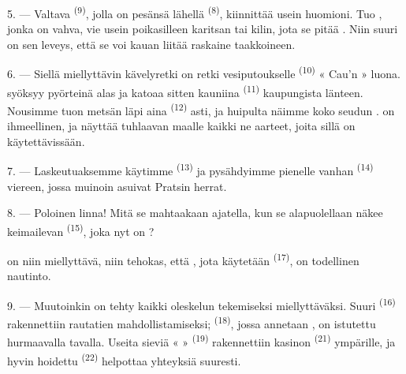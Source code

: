 5. --- Valtava  \textsuperscript{(9)}, jolla on pesänsä lähellä
 \textsuperscript{(8)}, kiinnittää usein huomioni. Tuo
, jonka  on vahva, vie usein poikasilleen
karitsan tai kilin, jota se pitää . Niin suuri on sen
 leveys, että se voi kauan liitää raskaine taakkoineen.

\VUsaut{3.0mm}
\VUsaut{3.0mm}

6. --- Siellä miellyttävin kävelyretki on retki vesiputoukselle
\textsuperscript{(10)} « Cau'n » luona.  syöksyy pyörteinä
alas ja katoaa sitten kauniina  
\textsuperscript{(11)} kaupungista länteen. Nousimme tuon metsän läpi aina
 \textsuperscript{(12)} asti, ja
 huipulta näimme koko seudun .
 on ihmeellinen, ja  näyttää tuhlaavan maalle
kaikki ne aarteet, joita sillä on käytettävissään.

7. --- Laskeutuaksemme käytimme  \textsuperscript{(13)} ja
pysähdyimme pienelle  vanhan 
 \textsuperscript{(14)} viereen, jossa muinoin asuivat
Pratsin herrat.

8. --- Poloinen linna! Mitä se mahtaakaan ajatella, kun se alapuolellaan näkee
keimailevan  \textsuperscript{(15)}, joka nyt on
?

 on niin miellyttävä,  niin tehokas, että
, jota käytetään  \textsuperscript{(17)}, on
todellinen nautinto.

\VUsaut{3.0mm}
\VUsaut{3.0mm}

9. --- Muutoinkin on tehty kaikki oleskelun tekemiseksi miellyttäväksi. Suuri
 \textsuperscript{(16)} rakennettiin rautatien
mahdollistamiseksi;  
\textsuperscript{(18)}, jossa annetaan , on istutettu
hurmaavalla tavalla. Useita sieviä «  »
\textsuperscript{(19)} rakennettiin kasinon \textsuperscript{(21)} ympärille, ja
hyvin hoidettu  \textsuperscript{(22)} helpottaa yhteyksiä
suuresti.

